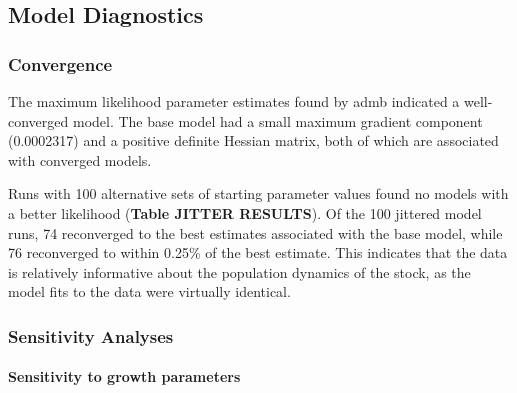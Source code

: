 \documentclass[11pt,
  english,
  letterpaper,
]{article}
\begin{document}
\hypertarget{model-diagnostics}{%
\subsection{Model Diagnostics}\label{model-diagnostics}}

\hypertarget{convergence}{%
\subsubsection{Convergence}\label{convergence}}

The maximum likelihood parameter estimates found by \gls{admb} indicated a well-converged model. The base model had a small maximum gradient component (0.0002317) and a positive definite Hessian matrix, both of which are associated with converged models.

Runs with 100 alternative sets of starting parameter values found no models with a better likelihood (\textbf{Table JITTER RESULTS}). Of the 100 jittered model runs, 74 reconverged to the best estimates associated with the base model, while 76 reconverged to within 0.25\% of the best estimate. This indicates that the data is relatively informative about the population dynamics of the stock, as the model fits to the data were virtually identical.

\hypertarget{sensitivity-analyses}{%
\subsubsection{Sensitivity Analyses}\label{sensitivity-analyses}}

\hypertarget{sensitivity-to-growth-parameters}{%
\paragraph{Sensitivity to growth parameters}\label{sensitivity-to-growth-parameters}}
\end{document}

